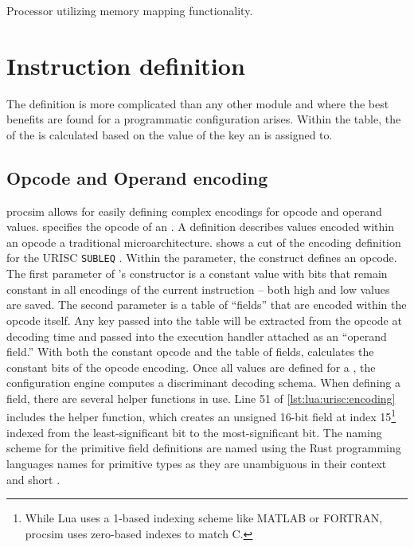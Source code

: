 \begin{listing}[hp!]
    \inputminted[escapeinside=||]{lua}{./listings/memory-mapping.lua}
    \caption{Processor utilizing memory mapping functionality.}
    \label{lst:lua:memory-mapped}
\end{listing}

\section{Instruction definition}
\label{sec:lua:sec:instructions}

The  definition is more complicated than any other module and where the best benefits are found for a programmatic configuration arises. Within the  table, the  of the  is calculated based on the value of the key an  is assigned to. 

\subsection{Opcode and Operand encoding}

procsim allows for easily defining complex encodings for opcode and operand values.  specifies the opcode of an . A  definition describes values encoded within an opcode a traditional microarchitecture.  shows a cut of the encoding definition for the URISC \texttt{SUBLEQ} . Within the  parameter, the  construct defines an opcode. The first parameter of 's constructor is a constant value with bits that remain constant in all encodings of the current instruction -- both high and low values are saved. The second parameter is a table of ``fields'' that are encoded within the opcode itself. Any key passed into the table will be extracted from the opcode at decoding time and passed into the execution handler attached as an ``operand field.'' With both the constant opcode and the table of fields,  calculates the constant bits of the opcode encoding. Once all  values are defined for a , the configuration engine computes a discriminant decoding schema. When defining a field, there are several helper functions in use. Line 51 of \cref{lst:lua:urisc:encoding} includes the helper function,  which creates an unsigned 16-bit field at index 15\footnote{While Lua uses a 1-based indexing scheme like MATLAB or FORTRAN, procsim uses zero-based indexes to match C.} indexed from the least-significant bit to the most-significant bit. The naming scheme for the primitive field definitions are named using the Rust programming languages names for primitive types as they are unambiguous in their context and short \cite{Rust:PrimitiveTypes:Numeric}.

